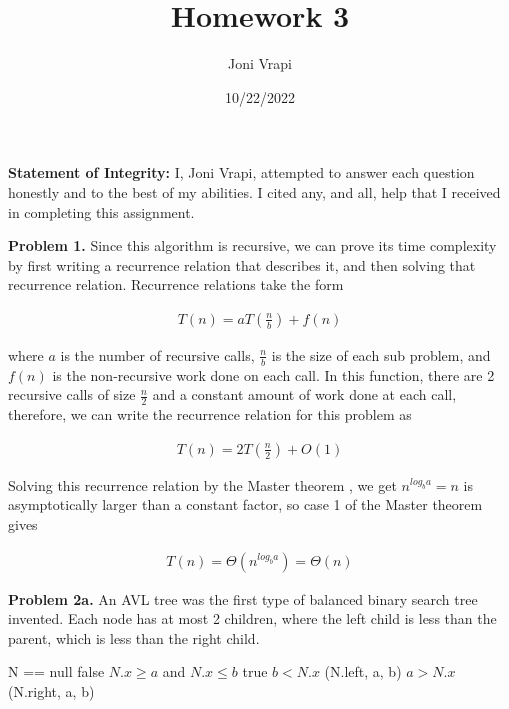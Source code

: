 \documentclass{article}
\title{Homework 3}
\author{Joni Vrapi}
\date{10/22/2022}
\begin{document}
\maketitle

\textbf{Statement of Integrity:} I, Joni Vrapi, attempted to answer each question honestly and to the best of my abilities. I cited any, and all, help that I received in completing this assignment.

\hfill

\textbf{Problem 1.} Since this algorithm is recursive, we can prove its time complexity by first writing a recurrence relation that describes it, and then solving that recurrence relation. Recurrence relations take the form 

\begin{gather}
    T(n) = aT(\frac{n}{b}) + f(n)
\end{gather}

where $a$ is the number of recursive calls, $\frac{n}{b}$ is the size of each sub problem, and $f(n)$ is the non-recursive work done on each call. In this function, there are 2 recursive calls of size $\frac{n}{2}$ and a constant amount of work done at each call, therefore, we  can write the recurrence relation for this problem as 

\begin{gather}
    T(n) = 2T(\frac{n}{2}) + O(1)
\end{gather}

Solving this recurrence relation by the Master theorem \cite{website:1}, we get $n^{log_b a} = n$ is asymptotically larger than a constant factor, so case 1 of the Master theorem gives

\begin{gather}
    T(n) = \Theta(n^{log_b a}) = \Theta(n)
\end{gather}

\hfill

\textbf{Problem 2a.} An AVL tree \cite{website:2} was the first type of balanced binary search tree invented. Each node has at most 2 children, where the left child is less than the parent, which is less than the right child. 

\begin{codebox}
    \li \If N == null \Then
    \li \Return false \End
    \li \If $N.x \geq a$ and $N.x \leq b$ \Then
    \li \Return true
    \li \Else 
    \li \If $b < N.x$ \Then
    \li \Return {}(N.left, a, b) \End
    \li \If $a > N.x$ \Then
    \li \Return {}(N.right, a, b) \End
    \li \End
\end{codebox}
\end{document}
